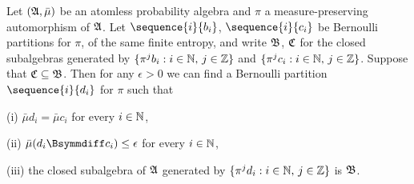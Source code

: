 Let $(\frak A,\bar\mu)$ be an atomless probability
algebra and $\pi$ a measure-preserving automorphism of $\frak A$.   Let
$\sequence{i}{b_i}$, $\sequence{i}{c_i}$ be Bernoulli partitions for
$\pi$, of the same finite entropy, and write $\frak B$, $\frak C$ for
the closed subalgebras generated by
$\{\pi^jb_i:i\in\Bbb N,\,j\in\Bbb Z\}$
and $\{\pi^jc_i:i\in\Bbb N,\,j\in\Bbb Z\}$.   Suppose that
$\frak C\subseteq\frak B$.   Then for any $\epsilon>0$ we can find a
Bernoulli partition $\sequence{i}{d_i}$ for $\pi$ such that

(i) $\bar\mu d_i=\bar\mu c_i$ for every $i\in\Bbb N$,

(ii) $\bar\mu(d_i\Bsymmdiff c_i)\le\epsilon$ for every $i\in\Bbb N$,

(iii) the closed subalgebra of $\frak A$ generated
by $\{\pi^jd_i:i\in\Bbb N,\,j\in\Bbb Z\}$ is $\frak B$.

